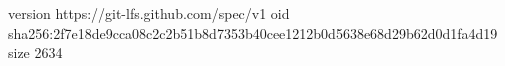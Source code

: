 version https://git-lfs.github.com/spec/v1
oid sha256:2f7e18de9cca08c2c2b51b8d7353b40cee1212b0d5638e68d29b62d0d1fa4d19
size 2634
